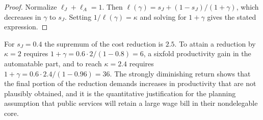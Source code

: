 \begin{proof}
Normalize $\ell_J+\ell_A=1$. Then $\ell(\gamma)=s_J+(1-s_J)/(1+\gamma)$, which decreases in $\gamma$ to $s_J$. Setting $1/\ell(\gamma)=\kappa$ and solving for $1+\gamma$ gives the stated expression.
\end{proof}

For $s_J=0.4$ the supremum of the cost reduction is $2.5$. To attain a reduction by $\kappa=2$ requires $1+\gamma=0.6\cdot2/(1-0.8)=6$, a sixfold productivity gain in the automatable part, and to reach $\kappa=2.4$ requires $1+\gamma=0.6\cdot2.4/(1-0.96)=36$. The strongly diminishing return shows that the final portion of the reduction demands increases in productivity that are not plausibly obtained, and it is the quantitative justification for the planning assumption that public services will retain a large wage bill in their nondelegable core.
